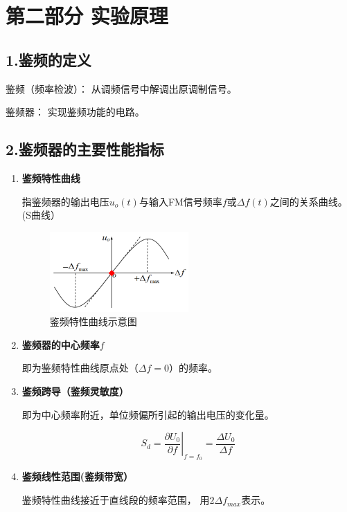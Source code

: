 \documentclass[UTF8]{ctexart}
\begin{document}
\section{第二部分 \texorpdfstring{\quad}{} 实验原理}

\subsection*{1.鉴频的定义}

鉴频（频率检波）： 从调频信号中解调出原调制信号。

鉴频器： 实现鉴频功能的电路。

\subsection*{2.鉴频器的主要性能指标}
\begin{enumerate}[(1)]
    \item \textbf{鉴频特性曲线}
    
    指鉴频器的输出电压$u_o(t)$与输入FM信号频率$f$或$\Delta f(t)$之间的关系曲线。(S曲线）
    \begin{figure}[H]
        \centering
        \includegraphics[width=0.5\textwidth]{pics/1.png}

        \caption{鉴频特性曲线示意图}\label{fig:1}
    \end{figure}

    \item \textbf{鉴频器的中心频率$f$}

    即为鉴频特性曲线原点处（$\Delta f=0$）的频率。

    \item \textbf{鉴频跨导（鉴频灵敏度）}

    即为中心频率附近，单位频偏所引起的输出电压的变化量。
    
    $$\left.S_d= \dfrac{\partial U_0}{\partial f}\right|_{f=f_0}=\dfrac{\Delta U_0}{\Delta f}$$

    \item \textbf{鉴频线性范围(鉴频带宽）}

    鉴频特性曲线接近于直线段的频率范围， 用$2\Delta f_{max}$表示。
    
\end{enumerate}
\end{document}
